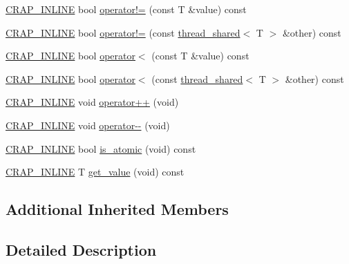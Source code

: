 \begin{DoxyCompactItemize}
\item 
\hyperlink{config__x86_8h_a5a40526b8d842e7ff731509998bb0f1c}{C\+R\+A\+P\+\_\+\+I\+N\+L\+I\+N\+E} bool \hyperlink{structcrap_1_1thread__shared_a5ee50b146a1f6a9bf7cdcff947e7584a}{operator!=} (const T \&value) const 
\item 
\hyperlink{config__x86_8h_a5a40526b8d842e7ff731509998bb0f1c}{C\+R\+A\+P\+\_\+\+I\+N\+L\+I\+N\+E} bool \hyperlink{structcrap_1_1thread__shared_af9b2faf5781b8150f8ff5fa604979496}{operator!=} (const \hyperlink{structcrap_1_1thread__shared}{thread\+\_\+shared}$<$ T $>$ \&other) const 
\item 
\hyperlink{config__x86_8h_a5a40526b8d842e7ff731509998bb0f1c}{C\+R\+A\+P\+\_\+\+I\+N\+L\+I\+N\+E} bool \hyperlink{structcrap_1_1thread__shared_a21093cf536d8dfce039776035e8b74da}{operator$<$} (const T \&value) const 
\item 
\hyperlink{config__x86_8h_a5a40526b8d842e7ff731509998bb0f1c}{C\+R\+A\+P\+\_\+\+I\+N\+L\+I\+N\+E} bool \hyperlink{structcrap_1_1thread__shared_a73f1b07379d33cd1716d0b8d8c09e1a8}{operator$<$} (const \hyperlink{structcrap_1_1thread__shared}{thread\+\_\+shared}$<$ T $>$ \&other) const 
\item 
\hyperlink{config__x86_8h_a5a40526b8d842e7ff731509998bb0f1c}{C\+R\+A\+P\+\_\+\+I\+N\+L\+I\+N\+E} void \hyperlink{structcrap_1_1thread__shared_ada5b917d8fcd3d1d7b15843ef8aa98f9}{operator++} (void)
\item 
\hyperlink{config__x86_8h_a5a40526b8d842e7ff731509998bb0f1c}{C\+R\+A\+P\+\_\+\+I\+N\+L\+I\+N\+E} void \hyperlink{structcrap_1_1thread__shared_a3d7664a67933a021f4c5b60a2b74c2ea}{operator-\/-\/} (void)
\item 
\hyperlink{config__x86_8h_a5a40526b8d842e7ff731509998bb0f1c}{C\+R\+A\+P\+\_\+\+I\+N\+L\+I\+N\+E} bool \hyperlink{structcrap_1_1thread__shared_a0e909b76522f5382a219e69d971a8915}{is\+\_\+atomic} (void) const 
\item 
\hyperlink{config__x86_8h_a5a40526b8d842e7ff731509998bb0f1c}{C\+R\+A\+P\+\_\+\+I\+N\+L\+I\+N\+E} T \hyperlink{structcrap_1_1thread__shared_a8514c2f202fbd156686f7ad5e5cfd66c}{get\+\_\+value} (void) const 
\end{DoxyCompactItemize}
\subsection*{Additional Inherited Members}


\subsection{Detailed Description}
